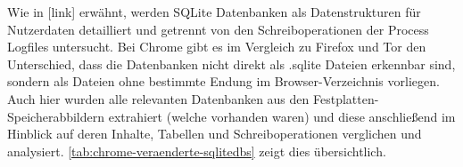 \begin{appendices}
Wie in [link] erwähnt, werden SQLite Datenbanken als Datenstrukturen für Nutzerdaten
detailliert und getrennt von den Schreiboperationen der Process Logfiles untersucht. Bei Chrome gibt es im Vergleich zu Firefox und Tor den Unterschied, dass die Datenbanken nicht direkt als .sqlite Dateien erkennbar sind, sondern als Dateien ohne bestimmte Endung im Browser-Verzeichnis vorliegen. \\ 
Auch hier wurden alle relevanten Datenbanken aus den Festplatten-Speicherabbildern extrahiert (welche vorhanden waren) und diese anschließend im Hinblick auf deren Inhalte, Tabellen und Schreiboperationen verglichen und analysiert. \autoref{tab:chrome-veraenderte-sqlitedbs} zeigt dies übersichtlich.

\begin{table}[h!]
	\centering
	\caption{Veränderung der Firefox SQLite-Datenbänke während der Versuchsdurchführung}
	\label{tab:chrome-veraenderte-sqlitedbs}  
\end{table}
\end{appendices}
